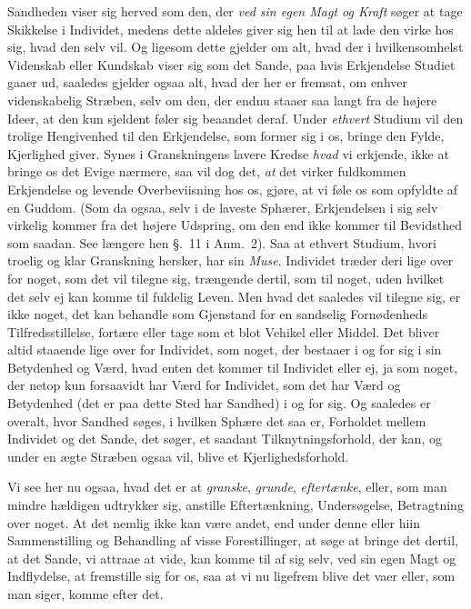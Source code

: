 \documentclass[12pt,a4paper]{book}
\newcommand{\apage}[1]{\marginnote{\footnotesize\textit{[#1]}}}
\begin{document}
Sandheden viser sig herved som den, der \emph{ved sin egen Magt og Kraft} søger
at tage Skikkelse i Individet, medens dette aldeles giver sig hen til at lade
den virke hos sig, hvad den selv vil. Og ligesom dette gjelder om alt, hvad der
i hvilkensomhelst Videnskab eller Kundskab viser sig som det Sande, paa hvis
Erkjendelse Studiet gaaer ud, saaledes gjelder ogsaa alt, hvad der her er
fremsat, om enhver videnskabelig Stræben, selv om den, der endnu staaer saa
langt fra de højere Ideer, at den kun sjeldent føler sig beaandet deraf. Under
\emph{ethvert} Studium vil den trolige Hengivenhed til den  \apage{13} Erkjendelse, som
former sig i os, bringe den Fylde, Kjerlighed giver. Synes i Granskningens
lavere Kredse \emph{hvad} vi erkjende, ikke at bringe os det Evige nærmere, saa vil dog
det, \emph{at} det virker fuldkommen Erkjendelse og levende Overbeviisning hos os,
gjøre, at vi føle os som opfyldte af en Guddom. (Som da ogsaa, selv i de laveste
Sphærer, Erkjendelsen i sig selv virkelig kommer fra det højere Udspring, om den
end ikke kommer til Bevidsthed som saadan. See længere hen §.~11 i Anm.~2). Saa
at ethvert Studium, hvori troelig og klar Granskning hersker, har sin
\emph{Muse}. Individet træder deri lige over for noget, som det vil tilegne sig,
trængende dertil, som til noget, uden hvilket det selv ej kan komme til fuldelig
Leven. Men hvad det saaledes vil tilegne sig, er ikke noget, det kan behandle
som Gjenstand for en sandselig Fornødenheds Tilfredsstillelse, fortære eller
tage som et blot Vehikel eller Middel. Det bliver altid staaende lige over for
Individet, som noget, der bestaaer i og for sig i sin Betydenhed og Værd, hvad
enten det kommer til Individet eller ej, ja som noget, der netop kun forsaavidt
har Værd for Individet, som det har Værd og Betydenhed (det er paa dette Sted
har Sandhed) i og for sig. Og saaledes er overalt, hvor Sandhed søges, i hvilken
Sphære det saa er, Forholdet mellem Individet og det Sande, det søger, et
saadant \apage{14} Tilknytningsforhold, der kan, og under en ægte Stræben ogsaa vil, blive
et Kjerlighedsforhold.

Vi see her nu ogsaa, hvad det er at \emph{granske}, \emph{grunde},
\emph{eftertænke}, eller, som man mindre hældigen udtrykker sig, anstille
Eftertænkning, Undersøgelse, Betragtning over noget. At det nemlig ikke kan være
andet, end under denne eller hiin Sammenstilling og Behandling af visse
Forestillinger, at søge at bringe det dertil, at det Sande, vi attraae at vide,
kan komme til af sig selv, ved sin egen Magt og Indflydelse, at fremstille sig
for os, saa at vi nu ligefrem blive det vaer eller, som man siger, komme efter
det.
\end{document}
